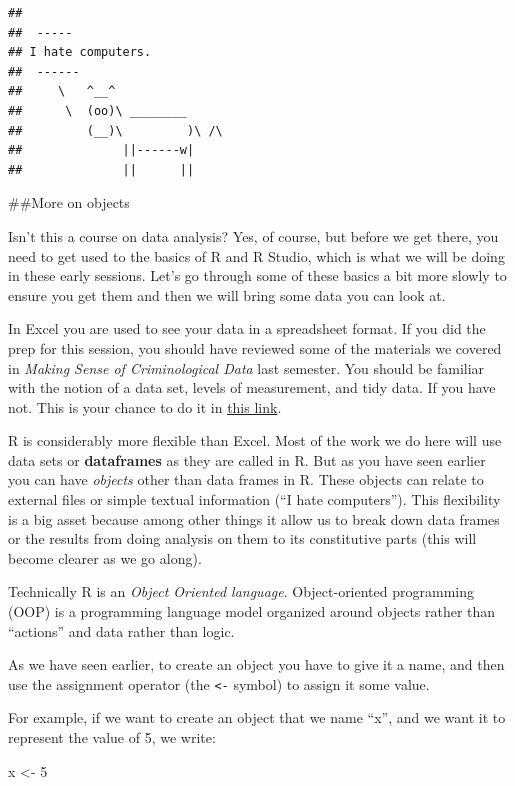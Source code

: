 \documentclass[]{book}
\newenvironment{Shaded}{\begin{snugshade}}{\end{snugshade}}
\newcommand{\DecValTok}[1]{\textcolor[rgb]{0.00,0.00,0.81}{#1}}
\newcommand{\NormalTok}[1]{#1}
\newcommand{\StringTok}[1]{\textcolor[rgb]{0.31,0.60,0.02}{#1}}
\theoremstyle{definition}
\theoremstyle{definition}
\theoremstyle{definition}
\theoremstyle{remark}
\begin{document}
\begin{verbatim}
## 
##  ----- 
## I hate computers. 
##  ------ 
##     \   ^__^ 
##      \  (oo)\ ________ 
##         (__)\         )\ /\ 
##              ||------w|
##              ||      ||
\end{verbatim}

\#\#More on objects

Isn't this a course on data analysis? Yes, of course, but before we get
there, you need to get used to the basics of R and R Studio, which is
what we will be doing in these early sessions. Let's go through some of
these basics a bit more slowly to ensure you get them and then we will
bring some data you can look at.

In Excel you are used to see your data in a spreadsheet format. If you
did the prep for this session, you should have reviewed some of the
materials we covered in \emph{Making Sense of Criminological Data} last
semester. You should be familiar with the notion of a data set, levels
of measurement, and tidy data. If you have not. This is your chance to
do it in
\href{https://rawgit.com/maczokni/MSCD/master/book/bookdown-demo-master/bookdown-demo-master/docs/week1.html\#data-variables-and-observations}{this
link}.

R is considerably more flexible than Excel. Most of the work we do here
will use data sets or \textbf{dataframes} as they are called in R. But
as you have seen earlier you can have \emph{objects} other than data
frames in R. These objects can relate to external files or simple
textual information (``I hate computers''). This flexibility is a big
asset because among other things it allow us to break down data frames
or the results from doing analysis on them to its constitutive parts
(this will become clearer as we go along).

Technically R is an \emph{Object Oriented language}. Object-oriented
programming (OOP) is a programming language model organized around
objects rather than ``actions'' and data rather than logic.

As we have seen earlier, to create an object you have to give it a name,
and then use the assignment operator (the \texttt{\textless{}-} symbol)
to assign it some value.

For example, if we want to create an object that we name ``x'', and we
want it to represent the value of 5, we write:

\begin{Shaded}
\begin{Highlighting}[]
\NormalTok{x <-}\StringTok{ }\DecValTok{5}
\end{Highlighting}
\end{Shaded}
\end{document}
